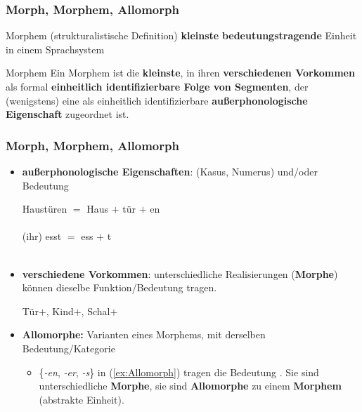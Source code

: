 \begin{frame}
\frametitle{Morph, Morphem, Allomorph}

\begin{block}{Morphem (strukturalistische Definition)}
	\textbf{kleinste} \textbf{bedeutungstragende} Einheit in einem Sprachsystem
\end{block}

\pause

\begin{block}{Morphem \citep[38]{Wurzel84x}}
	Ein Morphem ist die \textbf{kleinste}, in ihren \textbf{verschiedenen Vorkommen} als formal \textbf{einheitlich identifizierbare Folge von Segmenten}, der (wenigstens) eine als einheitlich identifizierbare \textbf{außerphonologische Eigenschaft} zugeordnet ist.
\end{block}

\end{frame}


\begin{frame}
\frametitle{Morph, Morphem, Allomorph}

\begin{itemize}
	\item \textbf{außerphonologische Eigenschaften}:  (\zB Kasus, Numerus) und/oder  Bedeutung
	
	\ea
		\ea
%		
		\gll Haustüren $=$ Haus $+$ tür $+$ en \\
		{} {}  {}  {}  \\
		
		\ex	
		\gll (ihr) esst $=$ ess $+$ t \\
		{} {} {}  {} \\
		
		\z
	\z 

\pause 
	
	\item \textbf{verschiedene Vorkommen}: unterschiedliche Realisierungen (\textbf{Morphe}) können dieselbe Funktion/Bedeutung tragen.
	
	\ea\label{ex:Allomorph} Tür$+$, Kind$+$, Schal$+$
	\z

\pause 
	
	\item \textbf{Allomorphe:} Varianten eines Morphems, mit derselben Bedeutung/Kategorie
	
	\begin{itemize}
		\item \{\emph{-en}, \emph{-er}, \emph{-s}\} in (\ref{ex:Allomorph}) tragen die Bedeutung . Sie sind unterschiedliche \textbf{Morphe}, sie sind \textbf{Allomorphe} zu einem \textbf{Morphem} (abstrakte Einheit).
	\end{itemize}

\end{itemize}
\end{frame}


